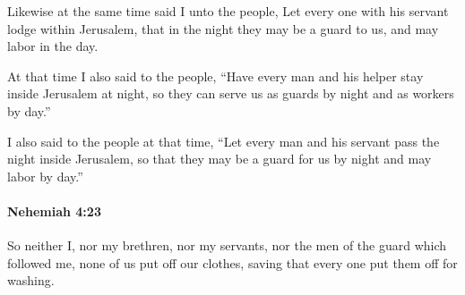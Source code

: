 			\begin{versebox}
					\item[BHS] 
					\item[LXX] 
					\item[ASV] Likewise at the same time said I unto the people, Let every one with his servant lodge within Jerusalem, that in the night they may be a guard to us, and may labor in the day.
					\item[NIV] At that time I also said to the people, “Have every man and his helper stay inside Jerusalem at night, so they can serve us as guards by night and as workers by day.”
					\item[NRSV] I also said to the people at that time, “Let every man and his servant pass the night inside Jerusalem, so that they may be a guard for us by night and may labor by day.”
			\end{versebox}

		\paragraph{Nehemiah 4:23} %
			\label{NEHEMIAH-4-23}

			So neither I, nor my brethren, nor my servants, nor the men of the guard which followed me, none of us put off our clothes, saving that every one put them off for washing.

